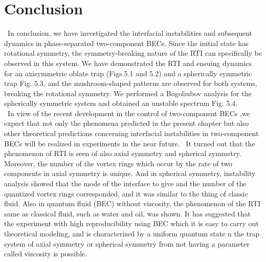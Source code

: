\documentclass[12pt,a4paper]{report} %
\begin{document}
\section{Conclusion}
\ In conclusion, we have investigated the interfacial instabilities
and subsequent dynamics in phase-separated two-component
BECs. Since the initial state has rotational symmetry,
the symmetry-breaking nature of the RTI can specifically
be observed in this system. We have demonstrated the RTI and
ensuing dynamics for an axisymmetric oblate trap (Figs.5.1 and 5.2)
and a spherically symmetric trap Fig. 5.3, and the
mushroom-shaped patterns are observed for both systems,
breaking the rotational symmetry. We performed a Bogoliubov
analysis for the spherically symmetric system and obtained an
unstable spectrum Fig. 5.4.
\\
\ In view of the recent development in the control of 
two-component BECs \cite{72}\cite{75}\cite{76},we expect that not only the 
phenomena predicted in the present chapter but also other
theoretical predictions \cite{62}\cite{63}\cite{64}\cite{65}\cite{77}\cite{78}\cite{79}\cite{80}
concerning interfacial instabilities in
two-component BECs will be realized in experiments in the near future.
\ It turned out that the phenomenon of RTI is seen
of also axial symmetry and spherical symmetry. 
Moreover, the number of the vortex rings
which occur by the rate of two components
in axial symmetry is unique. 
And in spherical symmetry,
instability analysis showed
that the mode of the interface
to give and the number of the quantized vortex rings corresponded,
and it was similar to the thing of classic fluid. 
Also in quantum fluid (BEC) without viscosity,
the phenomenon of the RTI same as classical fluid,
such as water and oil, was shown. 
It has suggested that the experiment
with high reproducibility using BEC
which it is easy to carry out theoretical modeling,
and is characterized by a uniform quantum state 
n the trap system of axial symmetry
or spherical symmetry from not having a parameter
called viscosity is possible. 
\fi
\end{document}
